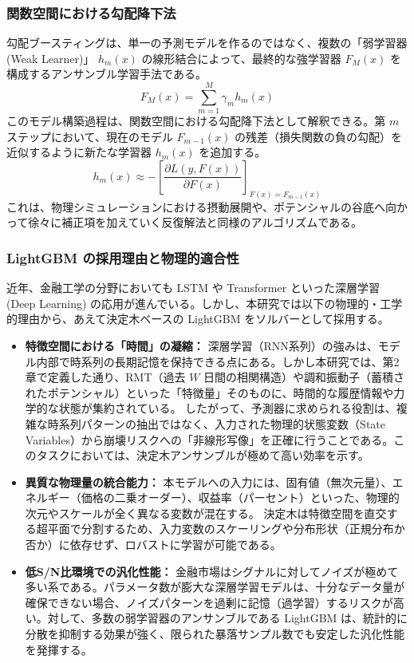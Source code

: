 \documentclass[11pt,a4paper,oneside]{ltjsarticle}
\begin{document}
\subsubsection{関数空間における勾配降下法}
勾配ブースティングは、単一の予測モデルを作るのではなく、複数の「弱学習器 (Weak Learner)」 $h_{m}(x)$ の線形結合によって、最終的な強学習器 $F_{M}(x)$ を構成するアンサンブル学習手法である。
\begin{equation}
F_{M}(x) = \sum_{m=1}^{M} \gamma_{m} h_{m}(x)
\end{equation}
このモデル構築過程は、関数空間における勾配降下法として解釈できる。第 $m$ ステップにおいて、現在のモデル $F_{m-1}(x)$ の残差（損失関数の負の勾配）を近似するように新たな学習器 $h_{m}(x)$ を追加する。
\begin{equation}
h_{m}(x) \approx - \left[ \frac{\partial L(y, F(x))}{\partial F(x)} \right]_{F(x)=F_{m-1}(x)}
\end{equation}
これは、物理シミュレーションにおける摂動展開や、ポテンシャルの谷底へ向かって徐々に補正項を加えていく反復解法と同様のアルゴリズムである。

\subsubsection{LightGBM の採用理由と物理的適合性}
近年、金融工学の分野においても LSTM や Transformer といった深層学習 (Deep Learning) の応用が進んでいる。しかし、本研究では以下の物理的・工学的理由から、あえて決定木ベースの LightGBM をソルバーとして採用する。

\begin{itemize}
    \item \textbf{特徴空間における「時間」の凝縮：}
    深層学習（RNN系列）の強みは、モデル内部で時系列の長期記憶を保持できる点にある。しかし本研究では、第2章で定義した通り、RMT（過去 $W$ 日間の相関構造）や調和振動子（蓄積されたポテンシャル）といった「特徴量」そのものに、時間的な履歴情報や力学的な状態が集約されている。
    したがって、予測器に求められる役割は、複雑な時系列パターンの抽出ではなく、入力された物理的状態変数（State Variables）から崩壊リスクへの「非線形写像」を正確に行うことである。このタスクにおいては、決定木アンサンブルが極めて高い効率を示す。

    \item \textbf{異質な物理量の統合能力：}
    本モデルへの入力には、固有値（無次元量）、エネルギー（価格の二乗オーダー）、収益率（パーセント）といった、物理的次元やスケールが全く異なる変数が混在する。
    決定木は特徴空間を直交する超平面で分割するため、入力変数のスケーリングや分布形状（正規分布か否か）に依存せず、ロバストに学習が可能である。

    \item \textbf{低S/N比環境での汎化性能：}
    金融市場はシグナルに対してノイズが極めて多い系である。パラメータ数が膨大な深層学習モデルは、十分なデータ量が確保できない場合、ノイズパターンを過剰に記憶（過学習）するリスクが高い。対して、多数の弱学習器のアンサンブルである LightGBM は、統計的に分散を抑制する効果が強く、限られた暴落サンプル数でも安定した汎化性能を発揮する。
\end{itemize}
\end{document}
